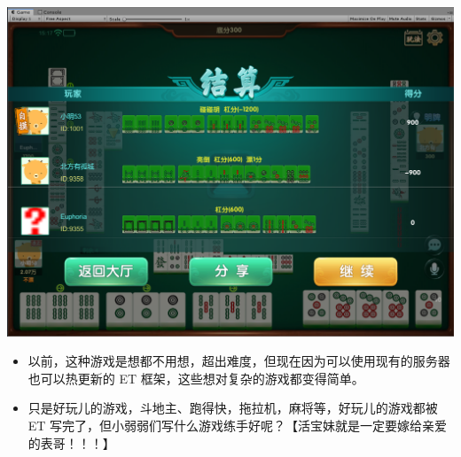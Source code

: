 \documentclass[9pt, b5paper]{article}
\begin{document}
\begin{center}
\includegraphics[width=.9\linewidth]{./pic/readme_20230508_151755.png}
\end{center}
\begin{itemize}
\item 以前，这种游戏是想都不用想，超出难度，但现在因为可以使用现有的服务器也可以热更新的 ET 框架，这些想对复杂的游戏都变得简单。
\item 只是好玩儿的游戏，斗地主、跑得快，拖拉机，麻将等，好玩儿的游戏都被 ET 写完了，但小弱弱们写什么游戏练手好呢？【活宝妹就是一定要嫁给亲爱的表哥！！！】
\end{itemize}
\end{document}
